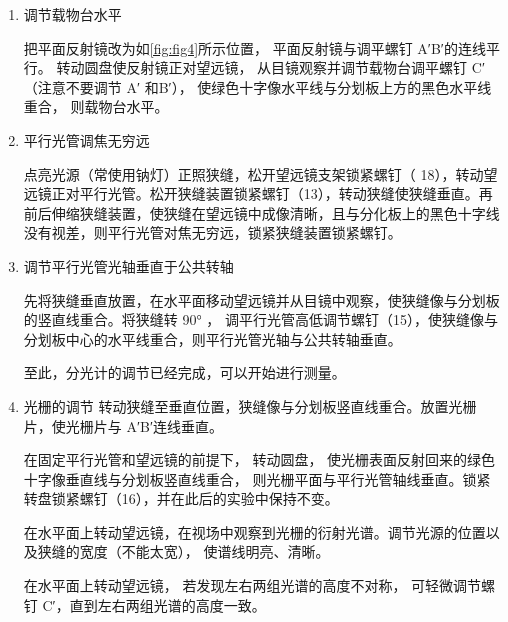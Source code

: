 \documentclass[dvipsnames, svgnames,a4paper,11pt]{article}
\begin{document}
\begin{enumerate}
\begin{enumerate}
			将游标盘转 180°，观察反射镜 B 面反射的绿色十字像。若绿色十字像的水平线与分划板上方的黑色水平线不重合，它们之间有垂直距离 l，则调节望远镜光轴高低调节螺钉（2）， 使距离减少一半。 然后再调节靠近望远镜的载物台调平螺钉 B′（此时不能调A′）， 使它们完全重合。
			
			如此交替进行多次，使从反射镜任何一反射面反射回来的绿色十字像的水平线均与分划板上方的黑色水平线重合，则望远镜的光轴与公共转轴垂直。之后整个望远镜的调节机构不能再作调节。
		\end{enumerate}
		\item 调节载物台水平
		
		把平面反射镜改为如\cref{fig:fig4}所示位置， 平面反射镜与调平螺钉 A′B′的连线平行。 转动圆盘使反射镜正对望远镜， 从目镜观察并调节载物台调平螺钉 C′（注意不要调节 A′ 和B′）， 使绿色十字像水平线与分划板上方的黑色水平线重合， 则载物台水平。
		
		\item 平行光管调焦无穷远
		
		点亮光源（常使用钠灯）正照狭缝，松开望远镜支架锁紧螺钉（ 18），转动望远镜正对平行光管。松开狭缝装置锁紧螺钉（13），转动狭缝使狭缝垂直。再前后伸缩狭缝装置，使狭缝在望远镜中成像清晰，且与分化板上的黑色十字线没有视差，则平行光管对焦无穷远，锁紧狭缝装置锁紧螺钉。
		
		\item 调节平行光管光轴垂直于公共转轴
		
		先将狭缝垂直放置，在水平面移动望远镜并从目镜中观察，使狭缝像与分划板的竖直线重合。将狭缝转 90° ， 调平行光管高低调节螺钉（15），使狭缝像与分划板中心的水平线重合，则平行光管光轴与公共转轴垂直。
		
		至此，分光计的调节已经完成，可以开始进行测量。
		
		\item 光栅的调节
		转动狭缝至垂直位置，狭缝像与分划板竖直线重合。放置光栅片，使光栅片与 A′B′连线垂直。
		
		在固定平行光管和望远镜的前提下， 转动圆盘， 使光栅表面反射回来的绿色十字像垂直线与分划板竖直线重合， 则光栅平面与平行光管轴线垂直。锁紧转盘锁紧螺钉（16），并在此后的实验中保持不变。
		
		在水平面上转动望远镜，在视场中观察到光栅的衍射光谱。调节光源的位置以及狭缝的宽度（不能太宽）， 使谱线明亮、清晰。
		
		在水平面上转动望远镜， 若发现左右两组光谱的高度不对称， 可轻微调节螺钉 C′，直到左右两组光谱的高度一致。
	\end{enumerate}
	
	\clearpage
\end{document}
